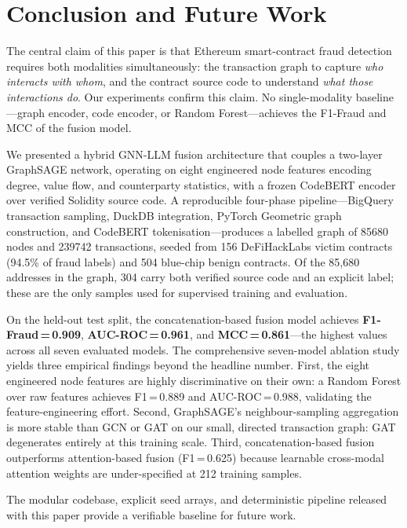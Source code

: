 \section{Conclusion and Future Work}
\label{sec:conclusion}

The central claim of this paper is that Ethereum smart-contract fraud
detection requires both modalities simultaneously: the transaction graph
to capture \emph{who interacts with whom}, and the contract source code
to understand \emph{what those interactions do}.  Our experiments confirm
this claim.  No single-modality baseline---graph encoder, code encoder,
or Random Forest---achieves the F1-Fraud and MCC of the fusion model.

We presented a hybrid GNN-LLM fusion architecture that couples a
two-layer GraphSAGE network, operating on eight engineered node features
encoding degree, value flow, and counterparty statistics, with a frozen
CodeBERT encoder over verified Solidity source code.  A reproducible
four-phase pipeline---BigQuery transaction sampling, DuckDB integration,
PyTorch Geometric graph construction, and CodeBERT tokenisation---produces
a labelled graph of \num{85680} nodes and \num{239742} transactions,
seeded from 156 DeFiHackLabs victim contracts (94.5\% of fraud labels)
and 504 blue-chip benign contracts.  Of the 85,680 addresses in the
graph, 304 carry both verified source code and an explicit label; these
are the only samples used for supervised training and evaluation.

On the held-out test split, the concatenation-based fusion model
achieves \textbf{F1-Fraud\,=\,0.909}, \textbf{AUC-ROC\,=\,0.961}, and
\textbf{MCC\,=\,0.861}---the highest values across all seven evaluated
models.  The comprehensive seven-model ablation study yields three
empirical findings beyond the headline number.
First, the eight engineered node features are highly discriminative on
their own: a Random Forest over raw features achieves
F1\,=\,0.889 and AUC-ROC\,=\,0.988, validating the feature-engineering
effort.  Second, GraphSAGE's neighbour-sampling aggregation is more
stable than GCN or GAT on our small, directed transaction graph: GAT
degenerates entirely at this training scale.  Third, concatenation-based
fusion outperforms attention-based fusion (F1\,=\,0.625) because learnable
cross-modal attention weights are under-specified at 212 training samples.

The modular codebase, explicit seed arrays, and deterministic pipeline
released with this paper provide a verifiable baseline for future work.

